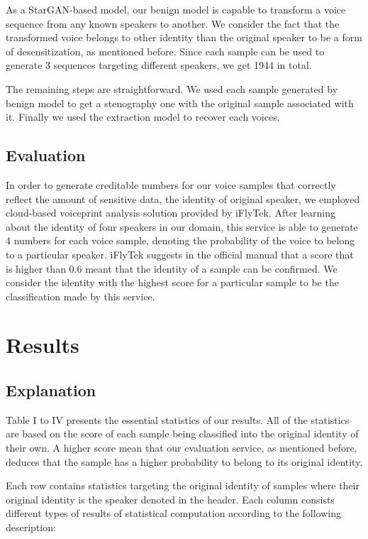 \documentclass[journal]{IEEEtran} %
\begin{document}
As a StarGAN-based model, our benign model is capable to transform a voice sequence from any known speakers to another. We consider the fact that the transformed voice belongs to other identity than the original speaker to be a form of desensitization, as mentioned before. Since each sample can be used to generate 3 sequences targeting different speakers, we get 1944 in total.

The remaining steps are straightforward. We used each sample generated by benign model to get a stenography one with the original sample associated with it. Finally we used the extraction model to recover each voices.

\subsection{Evaluation}

In order to generate creditable numbers for our voice samples that correctly reflect the amount of sensitive data, the identity of original speaker, we employed cloud-based voiceprint analysis solution provided by iFlyTek. After learning about the identity of four speakers in our domain, this service is able to generate 4 numbers for each voice sample, denoting the probability of the voice to belong to a particular speaker. iFlyTek suggests in the official manual that a score that is higher than 0.6 meant that the identity of a sample can be confirmed. We consider the identity with the highest score for a particular sample to be the classification made by this service.

\section{Results}

\subsection{Explanation}

Table I to IV presents the essential statistics of our results. All of the statistics are based on the score of each sample being classified into the original identity of their own. A higher score mean that our evaluation service, as mentioned before, deduces that the sample has a higher probability to belong to its original identity.

Each row contains statistics targeting the original identity of samples where their original identity is the speaker denoted in the header. Each column consists different types of results of statistical computation according to the following description:
\end{document}
